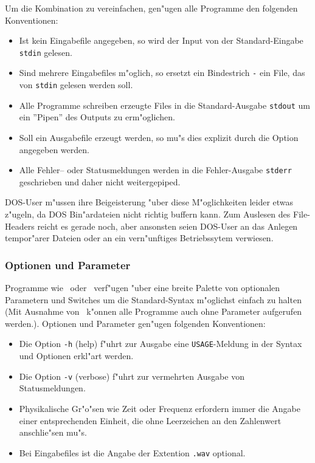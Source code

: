 Um die Kombination zu vereinfachen, gen"ugen alle Programme den
folgenden Konventionen:

\begin{itemize}
\item Ist kein Eingabefile angegeben, so wird der Input von der
      Standard-Eingabe {\tt stdin} gelesen.
\item Sind mehrere Eingabefiles m"oglich, so ersetzt ein Bindestrich
      {\tt -} ein File, das von {\tt stdin} gelesen werden soll.
\item Alle Programme schreiben erzeugte Files in die Standard-Ausgabe
      {\tt stdout} um ein ''Pipen'' des Outputs zu erm"oglichen.
\item Soll ein Ausgabefile erzeugt werden, so mu"s dies explizit
      durch die Option  angegeben werden.
\item Alle Fehler-- oder Statusmeldungen werden in die Fehler-Ausgabe
      {\tt stderr} geschrieben und daher nicht weitergepiped.
\end{itemize}

DOS-User m"ussen ihre Beigeisterung "uber diese M"oglichkeiten 
leider etwas z"ugeln, da DOS Bin"ardateien nicht richtig buffern
kann. Zum Auslesen des File-Headers reicht es gerade noch, aber
ansonsten seien DOS-User an das Anlegen tempor"arer Dateien oder an
ein vern"unftiges Betriebssytem verwiesen.

\subsubsection{Optionen und Parameter}

Programme wie \wflt\ oder \wfct\ verf"ugen "uber eine breite
Palette von optionalen Parametern und Switches um die Standard-Syntax
m"oglichst einfach zu halten (Mit Ausnahme von \wfct\ k"onnen alle
Programme auch ohne Parameter aufgerufen werden.).
Optionen und Parameter gen"ugen folgenden Konventionen:

\begin{itemize}
\item Die Option {\tt -h} (help) f"uhrt zur Ausgabe eine
      {\tt USAGE}-Meldung in der Syntax und Optionen erkl"art werden.
\item Die Option {\tt -v} (verbose) f"uhrt zur vermehrten Ausgabe
      von Statusmeldungen.
\item Physikalische Gr"o"sen wie Zeit oder Frequenz erfordern immer
      die Angabe einer entsprechenden Einheit, die ohne Leerzeichen
      an den Zahlenwert anschlie"sen mu"s.
\item Bei Eingabefiles ist die Angabe der Extention {\tt .wav} optional.
\end{itemize}

